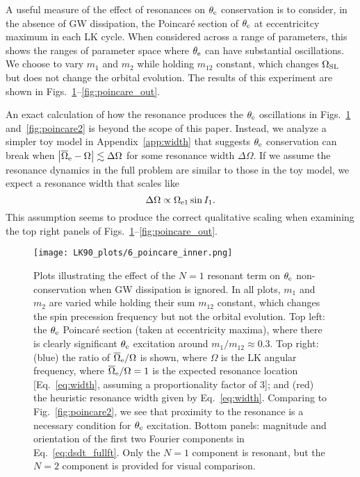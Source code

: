 \documentclass[
        twocolumn,
        twocolappendix
    ]{aastex63}
\newcommand*{\abs}[1]{\left|#1\right|}
\begin{document}
A useful measure of the effect of resonances on $\theta_{\rm e}$ conservation is
to consider, in the absence of GW dissipation, the Poincar\'e section of
$\theta_{\rm e}$ at eccentricitcy maximum in each LK cycle. When considered
across a range of parameters, this shows the ranges of parameter space where
$\theta_{\rm e}$ can have substantial oscillations. We choose to vary
$m_1$ and $m_2$ while holding $m_{12}$ constant, which changes $\Omega_{\rm SL}$
but does not change the orbital evolution. The results of this experiment are
shown in Figs.~\ref{fig:poincare1}--\ref{fig:poincare_out}.

An exact calculation of how the resonance produces the $\theta_{\rm e}$
oscillations in Figs.~\ref{fig:poincare1} and~\ref{fig:poincare2} is beyond the
scope of this paper. Instead, we analyze a simpler toy model in
Appendix~\ref{app:width} that suggests $\theta_{\rm e}$ conservation can break
when $\abs{\overline{\Omega}_{\rm e} - \Omega} \lesssim \Delta \Omega$ for some
resonance width $\Delta \Omega$. If we assume the resonance dynamics in the full
problem are similar to those in the toy model, we expect a resonance width that
scales like
\begin{equation}
    \Delta \Omega \propto \Omega_{\rm e1}\sin I_1.\label{eq:width}
\end{equation}
This assumption seems to produce the correct qualitative scaling when examining
the top right panels of Figs.~\ref{fig:poincare1}--\ref{fig:poincare_out}.
\begin{figure}
    \centering
    \texttt{[image: LK90\_plots/6\_poincare\_inner.png]}
    \caption{Plots illustrating the effect of the $N = 1$ resonant term on
    $\theta_{\rm e}$ non-conservation when GW dissipation is ignored. In all
    plots, $m_1$ and $m_2$ are varied while holding their sum $m_{12}$ constant,
    which changes the spin precession frequency but not the orbital evolution.
    Top left: the $\theta_{\rm e}$ Poincar\'e section (taken at eccentricity
    maxima), where there is clearly significant $\theta_{\rm e}$ excitation
    around $m_1 / m_{12} \approx 0.3$. Top right: (blue) the ratio of
    $\overline{\Omega}_{\rm e} / \Omega$ is shown, where $\Omega$ is the LK
    angular frequency, where $\overline{\Omega}_{\rm e} / \Omega = 1$ is the
    expected resonance location [Eq.~\eqref{eq:width}, assuming a
    proportionality factor of $3$]; and (red) the heuristic resonance width given
    by Eq.~\eqref{eq:width}. Comparing to Fig.~\ref{fig:poincare2}, we see that
    proximity to the resonance is a necessary condition for $\theta_{\rm e}$
    excitation. Bottom panels: magnitude and orientation of the first two
    Fourier components in Eq.~\eqref{eq:dsdt_fullft}. Only the $N = 1$ component
    is resonant, but the $N = 2$ component is provided for visual comparison.
    }\label{fig:poincare1}
\end{figure}
\end{document}
